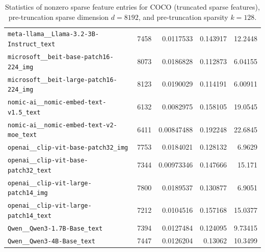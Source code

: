 \begin{table}[htbp]
{\begin{tabular}{lrrrr}
\texttt{meta-llama\_\_Llama-3.2-3B-Instruct\_text} & 7458 & 0.0117533 & 0.143917 & 12.2448 \\
\texttt{microsoft\_\_beit-base-patch16-224\_img} & 8073 & 0.0186828 & 0.112873 & 6.04155 \\
\texttt{microsoft\_\_beit-large-patch16-224\_img} & 8123 & 0.0190029 & 0.114191 & 6.00911 \\
\texttt{nomic-ai\_\_nomic-embed-text-v1.5\_text} & 6132 & 0.0082975 & 0.158105 & 19.0545 \\
\texttt{nomic-ai\_\_nomic-embed-text-v2-moe\_text} & 6411 & 0.00847488 & 0.192248 & 22.6845 \\
\texttt{openai\_\_clip-vit-base-patch32\_img} & 7753 & 0.0184021 & 0.128132 & 6.9629 \\
\texttt{openai\_\_clip-vit-base-patch32\_text} & 7344 & 0.00973346 & 0.147666 & 15.171 \\
\texttt{openai\_\_clip-vit-large-patch14\_img} & 7800 & 0.0189537 & 0.130877 & 6.9051 \\
\texttt{openai\_\_clip-vit-large-patch14\_text} & 7212 & 0.0104516 & 0.157168 & 15.0377 \\
\texttt{Qwen\_\_Qwen3-1.7B-Base\_text} & 7394 & 0.0127484 & 0.124095 & 9.73415 \\
\texttt{Qwen\_\_Qwen3-4B-Base\_text} & 7447 & 0.0126204 & 0.13062 & 10.3499 \\
\bottomrule
\end{tabular}
}%
\caption{Statistics of nonzero sparse feature entries for COCO (truncated sparse features), pre-truncation sparse dimension $d=8192$, and pre-truncation sparsity $k=128$.}
\label{tab:sparse-feature-entries-coco-truncated-d8192-k128}
\end{table}
